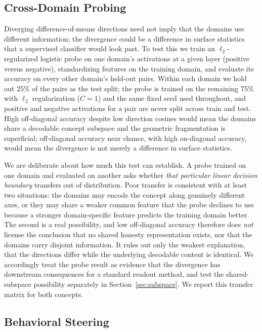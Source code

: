 \documentclass[11pt]{article}
\begin{document}
\subsection{Cross-Domain Probing}
\label{sec:probe-method}

Diverging difference-of-means directions need not imply that the domains use
different information; the divergence could be a difference in surface
statistics that a supervised classifier would look past. To test this we
train an $\ell_2$-regularized logistic probe on one domain's activations at a
given layer (positive versus negative), standardizing features on the
training domain, and evaluate its accuracy on every other domain's held-out
pairs. Within each domain we hold out 25\% of the pairs as the test split;
the probe is trained on the remaining 75\% with $\ell_2$ regularization
($C{=}1$) and the same fixed seed used throughout, and positive and negative
activations for a pair are never split across train and test. High
off-diagonal accuracy despite low direction cosines would mean the domains
share a decodable concept subspace and the geometric fragmentation is
superficial; off-diagonal accuracy near chance, with high on-diagonal
accuracy, would mean the divergence is not merely a difference in surface
statistics.

We are deliberate about how much this test can establish. A probe trained on
one domain and evaluated on another asks whether \emph{that particular
linear decision boundary} transfers out of distribution. Poor transfer is
consistent with at least two situations: the domains may encode the concept
along genuinely different axes, or they may share a weaker common feature
that the probe declines to use because a stronger domain-specific feature
predicts the training domain better. The second is a real possibility, and
low off-diagonal accuracy therefore does \emph{not} license the conclusion
that no shared honesty representation exists, nor that the domains carry
disjoint information. It rules out only the weakest explanation, that the
directions differ while the underlying decodable content is identical. We
accordingly treat the probe result as evidence that the divergence has
downstream consequences for a standard readout method, and test the
shared-subspace possibility separately in Section~\ref{sec:subspace}. We report this
transfer matrix for both concepts.

\subsection{Behavioral Steering}
\label{sec:steering-method}
\end{document}
